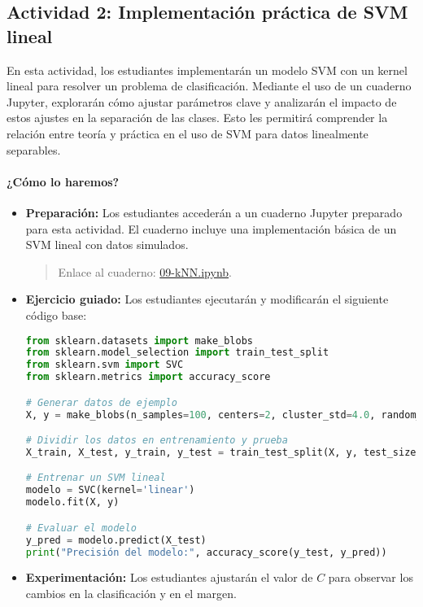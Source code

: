 \documentclass[a4,11pt]{aleph-notas}
\begin{document}
\subsection*{Actividad 2: Implementación práctica de SVM lineal}  
En esta actividad, los estudiantes implementarán un modelo SVM con un kernel lineal para resolver un problema de clasificación. Mediante el uso de un cuaderno Jupyter, explorarán cómo ajustar parámetros clave y analizarán el impacto de estos ajustes en la separación de las clases. Esto les permitirá comprender la relación entre teoría y práctica en el uso de SVM para datos linealmente separables.


\paragraph{¿Cómo lo haremos?}  
\begin{itemize}[leftmargin=*]  
    \item \textbf{Preparación:}  
    Los estudiantes accederán a un cuaderno Jupyter preparado para esta actividad. El cuaderno incluye una implementación básica de un SVM lineal con datos simulados.  
    \begin{quote}
        Enlace al cuaderno: \href{https://colab.research.google.com/github/andres-merino/AprendizajeAutomaticoInicial-05-N0105/blob/main/2-Notebooks/10-SVM.ipynb}{09-kNN.ipynb}.
    \end{quote}
    \item \textbf{Ejercicio guiado:}  
    Los estudiantes ejecutarán y modificarán el siguiente código base:  
\begin{pycodigo}  
\begin{lstlisting}[language=Python]  
from sklearn.datasets import make_blobs
from sklearn.model_selection import train_test_split  
from sklearn.svm import SVC  
from sklearn.metrics import accuracy_score  

# Generar datos de ejemplo  
X, y = make_blobs(n_samples=100, centers=2, cluster_std=4.0, random_state=42)

# Dividir los datos en entrenamiento y prueba
X_train, X_test, y_train, y_test = train_test_split(X, y, test_size=0.3, random_state=42)

# Entrenar un SVM lineal  
modelo = SVC(kernel='linear')  
modelo.fit(X, y)  

# Evaluar el modelo  
y_pred = modelo.predict(X_test)
print("Precisión del modelo:", accuracy_score(y_test, y_pred))
\end{lstlisting}  
\end{pycodigo}  

    \item \textbf{Experimentación:}  
    Los estudiantes ajustarán el valor de \( C \) para observar los cambios en la clasificación y en el margen.  
\end{itemize}  
\end{document}
